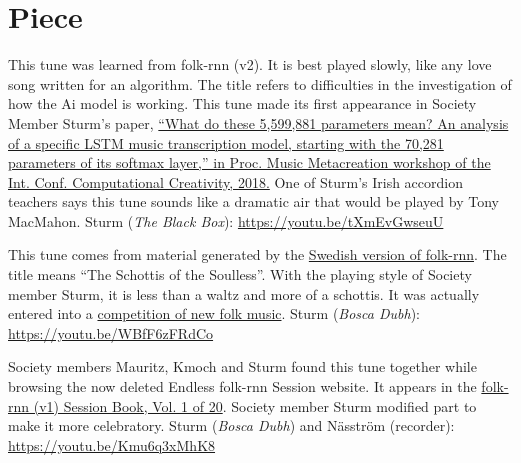 \documentclass[a4paper,notitlepage,twoside]{book}
\begin{document}
\section{Piece}
{}
\hypertarget{piece:WhyAreYou}{}
This tune was learned from folk-rnn (v2). 
It is best played slowly, like any love song written for an algorithm.
The title refers to difficulties in the investigation of how the Ai model is working.
This tune made its first appearance in Society Member Sturm's paper, 
\href{http://urn.kb.se/resolve?urn=urn:nbn:se:kth:diva-238604}
{``What do these 5,599,881 parameters mean? 
An analysis of a specific LSTM music transcription model, 
starting with the 70,281 parameters of its softmax layer,” 
in Proc. Music Metacreation workshop of the Int. Conf. Computational Creativity, 2018.}
One of Sturm's Irish accordion teachers says this tune sounds like a dramatic air
that would be played by Tony MacMahon.
Sturm ({\em The Black Box}): \url{https://youtu.be/tXmEvGwseuU}

{}  
  
\hypertarget{piece:SjallosasSchottis}{}
This tune comes from material generated by the \href{https://themachinefolksession.org/tune/1012}{Swedish version of folk-rnn}.
The title means ``The Schottis of the Soulless''.
With the playing style of Society member Sturm, it is less than a waltz and more of a schottis.
It was actually entered into a \href{https://www.stallet.st/sv/latskrivartavling}{competition of new folk music}.
Sturm ({\em Bosca Dubh}): \url{https://youtu.be/WBfF6zFRdCo}

{}  
Society members Mauritz, Kmoch and Sturm found this tune together 
while browsing the now deleted Endless folk-rnn Session website.
It appears in the \href{https://highnoongmt.wordpress.com/2018/01/05/volumes-1-20-of-folk-rnn-v1-transcriptions}{folk-rnn (v1) Session Book, Vol. 1 of 20}.
Society member Sturm modified part to make it more celebratory.
Sturm ({\em Bosca Dubh}) and Näsström (recorder): \url{https://youtu.be/Kmu6q3xMhK8}
\end{document}
